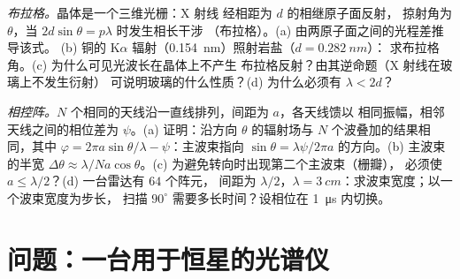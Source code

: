 \begin{exercise}[$\star\star\star$]\label{exo:b2:gratings:11}
\emph{布拉格。}晶体是一个三维光栅：X 射线
经相距为 $d$ 的相继原子面反射，
掠射角为 $\theta$，当 $2d\sin\theta = p\lambda$ 时发生相长干涉
（布拉格）。(a) 由两原子面之间的光程差推导该式。
(b) 铜的 K$\alpha$ 辐射（\qty{0.154}{nm}）照射岩盐（$d = \qty{0.282}{nm}$）：
求布拉格角。(c) 为什么可见光波长在晶体上不产生
布拉格反射？由其逆命题（X 射线在玻璃上不发生衍射）
可说明玻璃的什么性质？(d) 为什么必须有 $\lambda < 2d$？
\end{exercise}

\begin{exercise}[$\star\star\star$]\label{exo:b2:gratings:12}
\emph{相控阵。}$N$ 个相同的天线沿一直线排列，间距为 $a$，各天线馈以
相同振幅，相邻天线之间的相位差为 $\psi$。(a)
证明：沿方向 $\theta$ 的辐射场与
$N$ 个波叠加的结果相同，其中 $\varphi = 2\pi a\sin\theta/\lambda - \psi$：主波束指向
$\sin\theta = \lambda\psi/2\pi a$ 的方向。(b) 主波束的半宽 $\Delta\theta
\approx \lambda/Na\cos\theta$。(c) 为避免转向时出现第二个主波束（栅瓣），
必须使 $a \le \lambda/2$？(d) 一台雷达有 $64$ 个阵元，
间距为 $\lambda/2$，$\lambda = \qty{3}{cm}$：求波束宽度；以一个波束宽度为步长，
扫描 $90^\circ$ 需要多长时间？设相位在 \qty{1}{\micro s} 内切换。
\end{exercise}

\section{问题：一台用于恒星的光谱仪}

